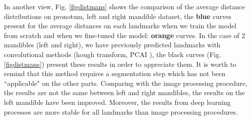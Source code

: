 \documentclass[review]{elsarticle}
\begin{document}
In another view, Fig. \ref{figdistmans} shows the comparison of the average distance distributions on pronotum, left and right mandible dataset, the \textbf{blue} curves present for the average distances on each landmarks when we train the model from scratch and when we fine-tuned the model: \textbf{orange} curves. In the case of $2$ mandibles (left and right), we have previously predicted landmarks with convolutional methods (hough transform, PCAI \cite{le2017maelab}), the black curves (Fig. \ref{figdistmans}) present these results in order to appreciate them. It is worth to remind that this method requires a segmentation step which has not been ``applicable" on the other parts. Comparing with the image processing procedure, the results are not the same between left and right mandibles, the results on the left mandible have been improved. Moreover, the results from deep learning processes are more stable for all landmarks than image processing procedures. 

\end{document}

